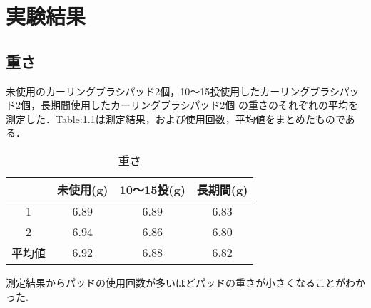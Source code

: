 \documentclass[main]{subfiles}
\begin{document}
\chapter{実験結果}
\section{重さ}
未使用のカーリングブラシパッド2個，10～15投使用したカーリングブラシパッド2個，長期間使用したカーリングブラシパッド2個
の重さのそれぞれの平均を測定した．Table:\ref{table:ttab}は測定結果，および使用回数，平均値をまとめたものである．
\\   

\begin{table}
    \centering
    \caption{重さ}
    \label{table:ttab}
  \begin{tabular}{c|c|c|c}

     & 未使用(g) & 10～15投(g) & 長期間(g)\\ \hline
    1 & 6.89 & 6.89 & 6.83\\ \hline
    2 & 6.94 & 6.86 & 6.80\\ \hline
    平均値& 6.92 & 6.88 & 6.82  \\
  \end{tabular}
\end{table}
測定結果からパッドの使用回数が多いほどパッドの重さが小さくなることがわかった.
\end{document}
